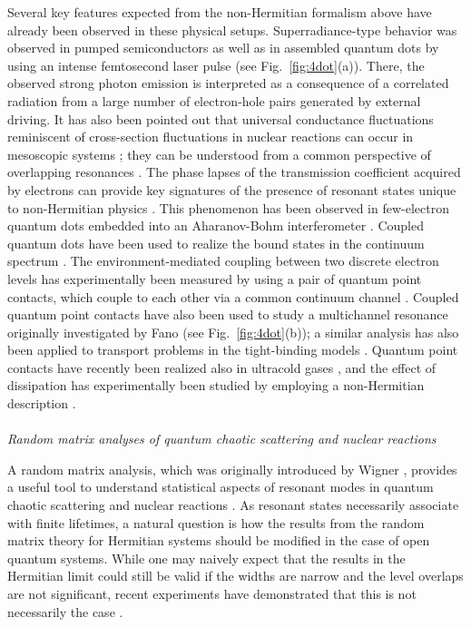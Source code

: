 \documentclass{tADP2e}
\theoremstyle{plain}
\theoremstyle{plain}
\theoremstyle{definition}
\begin{document}
Several key features expected from the non-Hermitian formalism above have already been observed in these physical setups. 
Superradiance-type behavior was observed in pumped semiconductors as well as in assembled quantum dots by using an intense femtosecond laser pulse \cite{SM07,NG12} (see Fig.~\ref{fig:4dot}(a)). There, the observed strong photon emission is interpreted as a consequence of a correlated radiation from a large number of electron-hole pairs generated by external driving. It has also been pointed out that universal conductance fluctuations reminiscent of cross-section fluctuations in nuclear reactions \cite{TE63} can occur in mesoscopic systems \cite{DS95}; they can be understood from a common perspective of overlapping resonances \cite{HAW90}. The phase lapses of the transmission coefficient acquired by electrons can provide key signatures of the presence of resonant states unique to non-Hermitian physics \cite{MM09}. This phenomenon has been observed in few-electron quantum dots embedded into an Aharanov-Bohm interferometer \cite{YA95,SR97,AKM05}. 
Coupled quantum dots have been used to realize the bound states in the continuum spectrum \cite{GML03}. 
 The environment-mediated coupling between two discrete electron levels has experimentally been measured by using a pair of quantum point contacts, which couple to each other via a common continuum channel \cite{MT03,PVI04,YY09}. 
Coupled quantum point contacts have also been used to study a multichannel resonance \cite{FJ14} originally investigated by Fano \cite{FU61} (see Fig.~\ref{fig:4dot}(b)); a similar analysis has also been applied to transport problems in the tight-binding models \cite{GG15}. 
Quantum point contacts have recently been realized also in ultracold gases  \cite{BJP12,DH15}, and the effect of dissipation has experimentally been studied by employing a non-Hermitian description \cite{LM19,CL19}.  
\\ \\ {\it Random matrix analyses of quantum chaotic scattering and nuclear reactions}

\vspace{3pt}
\noindent
A random matrix analysis, which was originally introduced by Wigner \cite{WEP56}, provides a useful tool to understand statistical aspects of resonant modes in quantum chaotic scattering and nuclear reactions \cite{PCE65}. As resonant states necessarily associate with finite lifetimes, a natural question is how the results from the random matrix theory for Hermitian systems should be modified in the case of open quantum systems. While one may naively expect that the results in the Hermitian limit could still be valid if the widths are narrow and the level overlaps are not significant, recent experiments have demonstrated that this is not necessarily the case \cite{KPE10}.
\end{document}
